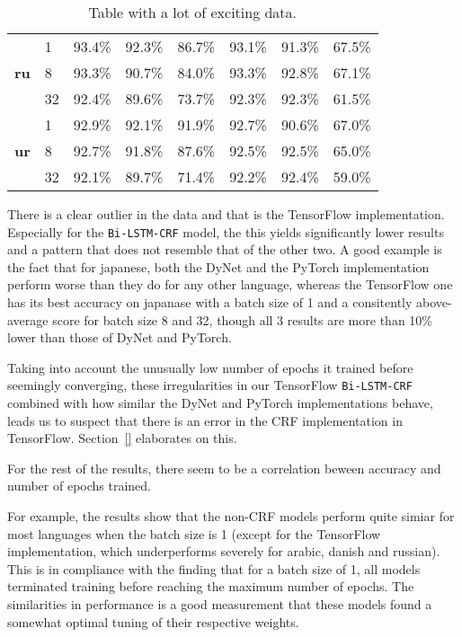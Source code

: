 \begin{table}[h]
\begin{tabular}{c l c c c|c c c}
        \cmidrule(lr){1-8}
        \multirow{3}{*}{\bfseries ru}
        &  1 & 93.4\% & 92.3\% & 86.7\% & 93.1\% & 91.3\% & 67.5\% \\
        &  8 & 93.3\% & 90.7\% & 84.0\% & 93.3\% & 92.8\% & 67.1\% \\
        & 32 & 92.4\% & 89.6\% & 73.7\% & 92.3\% & 92.3\% & 61.5\% \\

        \cmidrule(lr){1-8}
        \multirow{3}{*}{\bfseries ur}
        &  1 & 92.9\% & 92.1\% & 91.9\% & 92.7\% & 90.6\% & 67.0\% \\
        &  8 & 92.7\% & 91.8\% & 87.6\% & 92.5\% & 92.5\% & 65.0\% \\
        & 32 & 92.1\% & 89.7\% & 71.4\% & 92.2\% & 92.4\% & 59.0\% \\
        \bottomrule
    \end{tabular}
    \caption{Table with a lot of exciting data.
    }\label{table:acc-total-pos}
\end{table}


There is a clear outlier in the data and that is the TensorFlow implementation.
Especially for the \texttt{Bi-LSTM-CRF} model, the this yields significantly
lower results and a pattern that does not resemble that of the other two. A good
example is the fact that for japanese, both the DyNet and the PyTorch
implementation perform worse than they do for any other language, whereas the
TensorFlow one has its best accuracy on japanase with a batch size of 1 and  a
consitently above-average score for batch size 8 and 32, though all 3 results
are more than 10\% lower than those of DyNet and PyTorch.

Taking into account the unusually low number of epochs it trained before
seemingly converging, these irregularities in our TensorFlow
\texttt{Bi-LSTM-CRF} combined with how similar the DyNet and PyTorch
implementations behave, leads us to suspect that there is an error in the CRF
implementation in TensorFlow. Section~\ref{} elaborates on this.

For the rest of the results, there seem to be a correlation beween accuracy and
number of epochs trained.

For example, the results show that the non-CRF models perform quite simiar for
most languages when the batch size is 1 (except for the TensorFlow
implementation, which underperforms severely for arabic, danish and russian).
This is in compliance with the finding that for a batch size of 1, all models
terminated training before reaching the maximum number of epochs. The
similarities in performance is a good measurement that these models found a
somewhat optimal tuning of their respective weights.

